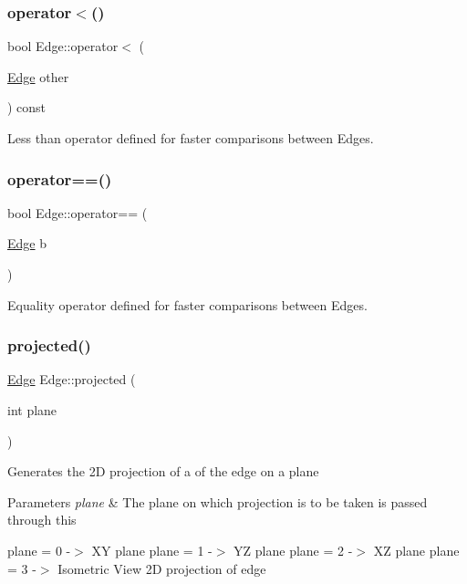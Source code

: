 \subsubsection{\texorpdfstring{operator$<$()}{operator<()}}
{\footnotesize\ttfamily bool Edge\+::operator$<$ (\begin{DoxyParamCaption}\item[{\hyperlink{structEdge}{Edge}}]{other }\end{DoxyParamCaption}) const\hspace{0.3cm}{\ttfamily [inline]}}



Less than operator defined for faster comparisons between Edges. 

\mbox{\label{structEdge_ad7b8ac3b7836a7258252d348caf3d2a9}} 
\subsubsection{\texorpdfstring{operator==()}{operator==()}}
{\footnotesize\ttfamily bool Edge\+::operator== (\begin{DoxyParamCaption}\item[{\hyperlink{structEdge}{Edge}}]{b }\end{DoxyParamCaption})\hspace{0.3cm}{\ttfamily [inline]}}



Equality operator defined for faster comparisons between Edges. 

\mbox{\label{structEdge_ad630958e9d2d4c3bcdd5fc74477ce842}} 
\subsubsection{\texorpdfstring{projected()}{projected()}}
{\footnotesize\ttfamily \hyperlink{structEdge}{Edge} Edge\+::projected (\begin{DoxyParamCaption}\item[{int}]{plane }\end{DoxyParamCaption})\hspace{0.3cm}{\ttfamily [inline]}}

Generates the 2D projection of a of the edge on a plane 
\begin{DoxyParams}{Parameters}
{\em plane} & The plane on which projection is to be taken is passed through this\\
\hline
\end{DoxyParams}
plane = 0 -\/$>$ XY plane plane = 1 -\/$>$ YZ plane plane = 2 -\/$>$ XZ plane plane = 3 -\/$>$ Isometric View 2D projection of edge 

